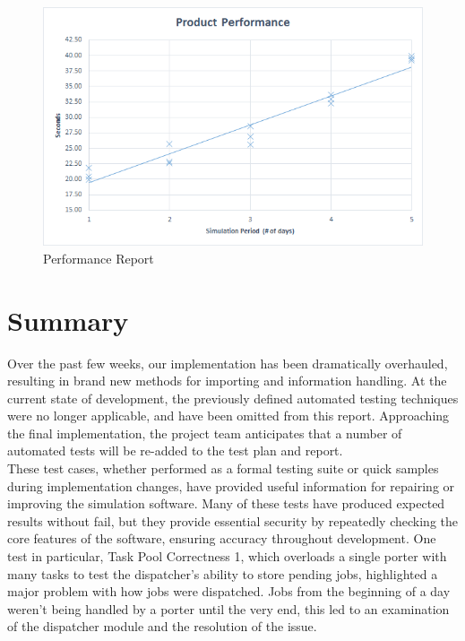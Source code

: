 \documentclass[paper=letter, fontsize=10pt]{scrartcl}
\numberwithin{equation}{section}		%
\numberwithin{figure}{section}			%
\numberwithin{table}{section}				%
\begin{document}
	\begin{figure}[!htbp]
		\begin{center}
			\includegraphics[width=1\columnwidth, height=0.4\textheight, keepaspectratio] {performancereport.png}
			\caption{Performance Report}
		\end{center}
	\end{figure}

\section{Summary}
Over the past few weeks, our implementation has been dramatically overhauled, resulting in brand new methods for importing and information handling. At the current state of development, the previously defined automated testing techniques were no longer applicable, and have been omitted from this report. Approaching the final implementation, the project team anticipates that a number of automated tests will be re-added to the test plan and report. 
\\
These test cases, whether performed as a formal testing suite or quick samples during implementation changes, have provided useful information for repairing or improving the simulation software. Many of these tests have produced expected results without fail, but they provide essential security by repeatedly checking the core features of the software, ensuring accuracy throughout development.   One test in particular, Task Pool Correctness 1, which overloads a single porter with many tasks to test the dispatcher's ability to store pending jobs, highlighted a major problem with how jobs were dispatched. Jobs from the beginning of a day weren't being handled by a porter until the very end, this led to an examination of the dispatcher module and the resolution of the issue. 
\end{document}
